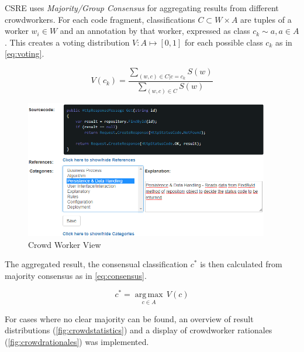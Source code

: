 CSRE uses \emph{Majority/Group Consensus} for aggregating results from different crowdworkers.
For each code fragment, classifications \(C\subset W \times A\) are tuples of a worker \(w_i \in W\) and an annotation by that worker, expressed as class \(c_k \sim a, a\in A\).
This creates a voting distribution \(V: A \mapsto [0,1]\) for each possible class \(c_k\) as in \cref{eq:voting}.


\begin{equation}V(c_k) = \frac{\sum\limits_{(w,c)\in C | c = c_k} S(w)}{\sum\limits_{(w,c)\in C} S(w)}\label{eq:voting}\end{equation}

\pagebreak
\begin{figure}[h!]
\hypertarget{fig:crowdview}{%
\centering
\includegraphics[width=0.95\textwidth]{../figures/screenshots/cw_view.png}
\caption{Crowd Worker View}\label{fig:crowdview}
}
\end{figure}

The aggregated result, the consensual classification \(c^*\) is then calculated from majority consensus as in \cref{eq:consensus}.

\vspace{-10pt}
\begin{equation}c^*=\underset{c \in A}{\operatorname{arg\,max}}\, V(c)\label{eq:consensus}\end{equation}

\vspace{-10pt}
For cases where no clear majority can be found, an overview of result distributions (\cref{fig:crowdstatistics}) and a display of crowdworker rationales (\cref{fig:crowdrationales}) was implemented.

